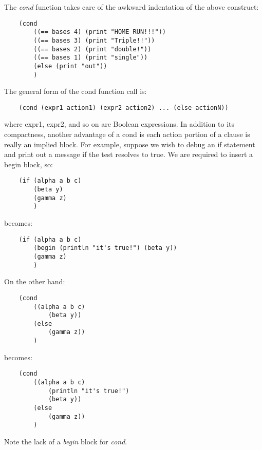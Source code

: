 The {\it cond} function takes care  of the awkward indentation
of the above construct:

\begin{verbatim}
    (cond
        ((== bases 4) (print "HOME RUN!!!"))
        ((== bases 3) (print "Triple!!"))
        ((== bases 2) (print "double!"))
        ((== bases 1) (print "single"))
        (else (print "out"))
        )
\end{verbatim}

The general form of the cond function call is:

\begin{verbatim}
    (cond (expr1 action1) (expr2 action2) ... (else actionN))
\end{verbatim}

where expr1, expr2, and so on are Boolean expressions. In addition
to its compactness, another advantage of a cond is each action
portion of a clause is really an implied block. For example,
suppose we wish to debug an if statement and print out a
message if the test resolves to true. We are required to insert
a begin block, so:

\begin{verbatim}
    (if (alpha a b c)
        (beta y)
        (gamma z)
        )
\end{verbatim}

becomes:

\begin{verbatim}
    (if (alpha a b c)
        (begin (println "it's true!") (beta y))
        (gamma z)
        )
\end{verbatim}

On the other hand:

\begin{verbatim}
    (cond
        ((alpha a b c)
            (beta y))
        (else
            (gamma z))
        )
\end{verbatim}

becomes:

\begin{verbatim}
    (cond
        ((alpha a b c)
            (println "it's true!")
            (beta y))
        (else
            (gamma z))
        )
\end{verbatim}

Note the lack of a {\it begin} block for {\it cond}.
